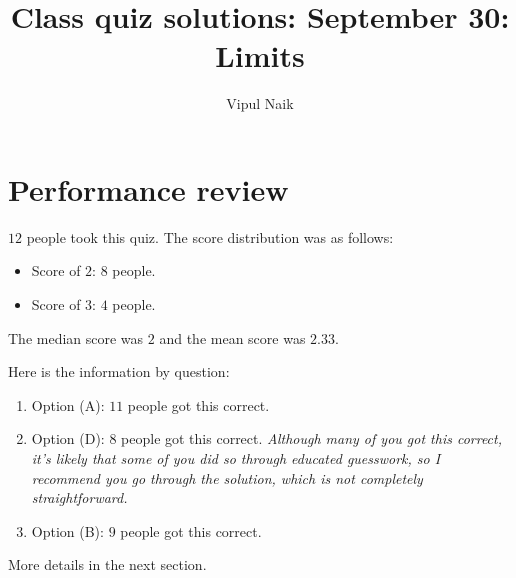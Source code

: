 \documentclass[10pt]{amsart}
\title{Class quiz solutions: September 30: Limits}
\author{Vipul Naik}
\begin{document}
\maketitle

\section{Performance review}

$12$ people took this quiz. The score distribution was as follows:

\begin{itemize}
\item Score of $2$: $8$ people.
\item Score of $3$: $4$ people.
\end{itemize}

The median score was $2$ and the mean score was $2.33$.

Here is the information by question:

\begin{enumerate}
\item Option (A): $11$ people got this correct.
\item Option (D): $8$ people got this correct. {\em Although many of
  you got this correct, it's likely that some of you did so through
  educated guesswork, so I recommend you go through the solution,
  which is not completely straightforward.}
\item Option (B): $9$ people got this correct.
\end{enumerate}

More details in the next section.
\end{document}
